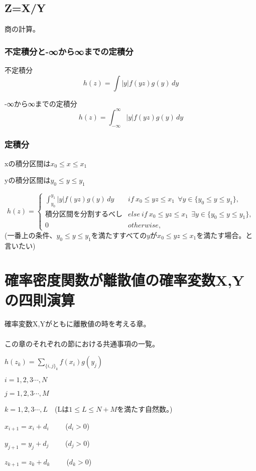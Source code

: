 \documentclass[a4paper,11pt]{ltjsarticle}
\begin{document}
\subsection{Z=X/Y}
商の計算。
\subsubsection{不定積分と-∞から∞までの定積分}
不定積分
$$
    h(z) = \int |y| f(yz) g(y)\,dy
$$

-∞から∞までの定積分
$$
    h(z) = \int_{-\infty}^{\infty} |y| f(yz) g(y)\,dy
$$
\subsubsection{定積分}
\begin{description}
    \item xの積分区間は$x_0 \leq x \leq x_1$
    \item yの積分区間は$y_0 \leq y \leq y_1$
\end{description}
$$
    h(z)=
    \begin{cases}
        \int_{y_0}^{y_1} |y| f(yz) g(y)\,dy & if\ x_0 \leq yz \leq x_1 \ \ \forall y\in \{ y_0 \leq y \leq y_1\},\\
        積分区間を分割するべし                & else \ if\ x_0 \leq yz \leq x_1 \ \ \exists y\in \{ y_0 \leq y \leq y_1\}, \\
        0                                   & otherwise,
    \end{cases}
$$
(一番上の条件、$y_0 \leq y \leq y_1$を満たすすべての$y$が$x_0 \leq yz \leq x_1$を満たす場合。と言いたい)

\newpage


\section{確率密度関数が離散値の確率変数X,Yの四則演算}
確率変数X,Yがともに離散値の時を考える章。\\
\\

この章のそれぞれの節における共通事項の一覧。
\begin{description}
    \item $h(z_k) = \sum_{\{ i,j \}_k} f(x_i)g(y_j)$
    \item $i=1,2,3\cdots,N$
    \item $j=1,2,3\cdots,M$
    \item $k=1,2,3\cdots,L$\ \ (Lは$1\leq L \leq N+M$を満たす自然数。)
    \item $x_{i+1}=x_i+d_i$ \ \ \ \ ($d_i>0$)
    \item $y_{j+1}=y_j+d_j$ \ \ \ \ ($d_j>0$)
    \item $z_{k+1}=z_k+d_k$ \ \ \ \ ($d_k>0$)
\end{description}
\end{document}
